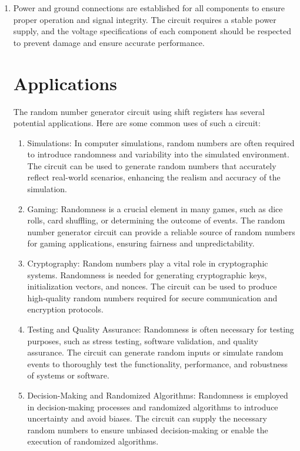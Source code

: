 \documentclass[journal,12pt,twocolumn]{IEEEtran}
\begin{document}
\begin{enumerate}
	\item Power and ground connections are established for all components to ensure proper operation and signal integrity. The circuit requires a stable power supply, and the voltage specifications of each component should be respected to prevent damage and ensure accurate performance.
\section{Applications}
The random number generator circuit using shift registers has several potential applications. Here are some common uses of such a circuit:
\begin{enumerate}
\item Simulations: In computer simulations, random numbers are often required to introduce randomness and variability into the simulated environment. The circuit can be used to generate random numbers that accurately reflect real-world scenarios, enhancing the realism and accuracy of the simulation.

\item Gaming: Randomness is a crucial element in many games, such as dice rolls, card shuffling, or determining the outcome of events. The random number generator circuit can provide a reliable source of random numbers for gaming applications, ensuring fairness and unpredictability.

\item Cryptography: Random numbers play a vital role in cryptographic systems. Randomness is needed for generating cryptographic keys, initialization vectors, and nonces. The circuit can be used to produce high-quality random numbers required for secure communication and encryption protocols.

\item Testing and Quality Assurance: Randomness is often necessary for testing purposes, such as stress testing, software validation, and quality assurance. The circuit can generate random inputs or simulate random events to thoroughly test the functionality, performance, and robustness of systems or software.

\item Decision-Making and Randomized Algorithms: Randomness is employed in decision-making processes and randomized algorithms to introduce uncertainty and avoid biases. The circuit can supply the necessary random numbers to ensure unbiased decision-making or enable the execution of randomized algorithms.
\end{enumerate}

\end{enumerate}
\end{document}
